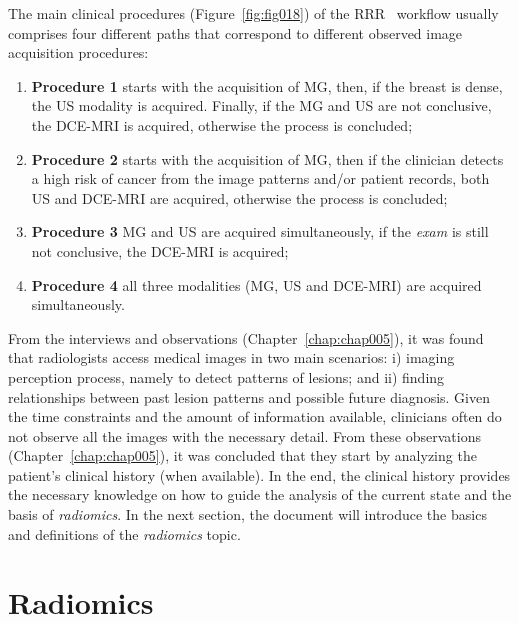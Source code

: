 \hfill

\noindent
The main clinical procedures (Figure~\ref{fig:fig018}) of the \ac{RRR}~\cite{wagner2015analysis} workflow usually comprises four different paths that correspond to different observed image acquisition procedures:

\begin{enumerate}
\item \textbf{Procedure 1} starts with the acquisition of \ac{MG}, then, if the breast is dense, the \ac{US} modality is acquired. Finally, if the \ac{MG} and \ac{US} are not conclusive, the \ac{DCE}-\ac{MRI} is acquired, otherwise the process is concluded;
\item \textbf{Procedure 2} starts with the acquisition of \ac{MG}, then if the clinician detects a high risk of cancer from the image patterns and/or patient records, both \ac{US} and \ac{DCE}-\ac{MRI} are acquired, otherwise the process is concluded;
\item \textbf{Procedure 3} \ac{MG} and \ac{US} are acquired simultaneously, if the {\it exam} is still not conclusive, the \ac{DCE}-\ac{MRI} is acquired;
\item \textbf{Procedure 4} all three modalities (\ac{MG}, \ac{US} and \ac{DCE}-\ac{MRI}) are acquired simultaneously.
\end{enumerate}

\hfill

From the interviews and observations (Chapter~\ref{chap:chap005}), it was found that radiologists access medical images in two main scenarios:
i) imaging perception process, namely to detect patterns of lesions;
and ii) finding relationships between past lesion patterns and possible future diagnosis.
Given the time constraints and the amount of information available, clinicians often do not observe all the images with the necessary detail.
From these observations (Chapter~\ref{chap:chap005}), it was concluded that they start by analyzing the patient's clinical history (when available).
In the end, the clinical history provides the necessary knowledge on how to guide the analysis of the current state and the basis of {\it radiomics}.
In the next section, the document will introduce the basics and definitions of the {\it radiomics} topic.

\section{Radiomics}
\label{sec:chap002006}

